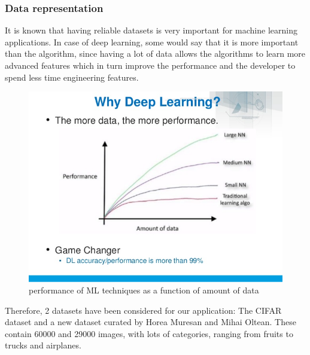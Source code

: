 \documentclass[a4paper,11pt]{article}
\begin{document}
  \subsubsection{Data representation}
	It is known that having reliable datasets is very important for machine learning applications. In case of deep learning, some would say that it is more important than the algorithm, since having a lot of data allows the algorithms to learn more advanced features which in turn improve the performance and the developer to spend less time engineering features.
	\begin{figure}[H]
		\includegraphics[width=\textwidth]{performanceComparison.jpg}
		\caption{performance of ML techniques as a function of amount of data}
	\end{figure}
	Therefore, 2 datasets have been considered for our application: The CIFAR dataset\cite{CIFAR} and a new dataset curated by Horea Muresan and Mihai Oltean. \cite{HoreaDataset} 
	These contain 60000 and 29000 images, with lots of categories, ranging from fruits to trucks and airplanes.
\end{document}
